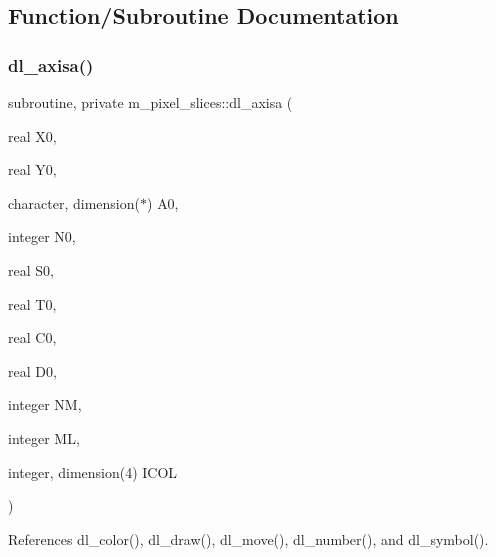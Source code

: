 \subsection{Function/\+Subroutine Documentation}
\mbox{\label{namespacem__pixel__slices_afcc122fe448b5f806c0a372a203cd9ea}} 
\subsubsection{\texorpdfstring{dl\+\_\+axisa()}{dl\_axisa()}}
{\footnotesize\ttfamily subroutine, private m\+\_\+pixel\+\_\+slices\+::dl\+\_\+axisa (\begin{DoxyParamCaption}\item[{real}]{X0,  }\item[{real}]{Y0,  }\item[{character, dimension($\ast$)}]{A0,  }\item[{integer}]{N0,  }\item[{real}]{S0,  }\item[{real}]{T0,  }\item[{real}]{C0,  }\item[{real}]{D0,  }\item[{integer}]{NM,  }\item[{integer}]{ML,  }\item[{integer, dimension(4)}]{I\+C\+OL }\end{DoxyParamCaption})\hspace{0.3cm}{\ttfamily [private]}}



References dl\+\_\+color(), dl\+\_\+draw(), dl\+\_\+move(), dl\+\_\+number(), and dl\+\_\+symbol().

